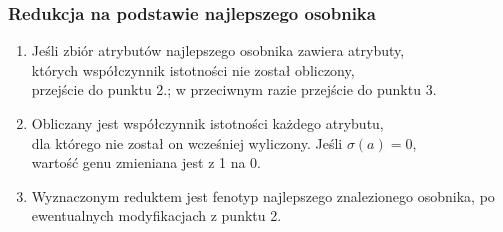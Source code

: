 \documentclass[10pt]{beamer}
\begin{document}



\begin{frame}
\frametitle{Redukcja na podstawie najlepszego osobnika}
\begin{spacing}{1.3}
\begin{flushleft}
\begin{enumerate}[1.]
\item Jeśli zbiór atrybutów najlepszego osobnika zawiera atrybuty,\\
których współczynnik istotności nie został obliczony,\\
przejście do punktu 2.; w przeciwnym razie przejście do punktu 3.
\item Obliczany jest współczynnik istotności każdego atrybutu,\\
dla którego nie został on wcześniej wyliczony. Jeśli $\sigma(a) = 0$,\\ wartość genu zmieniana jest z 1 na 0.
\item Wyznaczonym reduktem jest fenotyp najlepszego znalezionego osobnika, po ewentualnych modyfikacjach z punktu 2.
\end{enumerate}
\end{flushleft}
\end{spacing}

\end{frame}
\end{document}
